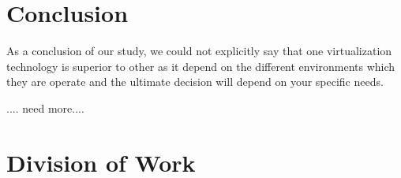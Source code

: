 \documentclass[11pt]{article}
\begin{document}
\section{Conclusion}

As a conclusion of our study, we could not explicitly say that one virtualization technology is superior to other as it depend on the different environments which they are operate and the ultimate decision will depend on your specific needs. 


.... need more....



\section{Division of Work}





{}

\end{document}
